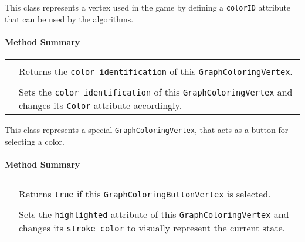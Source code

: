 This class represents a \gls{vertex} used in the \graphcoloring \gls{game} by defining a \texttt{colorID} attribute that can be used by the \graphcoloring \gls{algorithm}s. \\


\centerdash

\paragraph*{Method Summary}
\paragraph*{}
\begin{longtable}{Lp{10cm}}
	\startmethodtable
	 \\
	& Returns the \texttt{color identification} of this \texttt{GraphColoringVertex}. \\
	 \\
	& Sets the \texttt{color identification} of this \texttt{GraphColoringVertex} and changes its \texttt{Color} attribute accordingly. \\
	
	\hline
\end{longtable}

\pagebreak


This class represents a special \texttt{GraphColoringVertex}, that acts as a button for selecting a color. \\ 

\centerdash

\paragraph*{Method Summary}
\paragraph*{}
\begin{longtable}{Lp{10cm}}
	\startmethodtable
	 \\
	& Returns \texttt{true} if this \texttt{GraphColoringButtonVertex} is selected. \\
	 \\
	& Sets the \texttt{highlighted} attribute of this \texttt{GraphColoringVertex} and changes its \texttt{stroke color} to visually represent the current state. \\
	\hline
\end{longtable}

